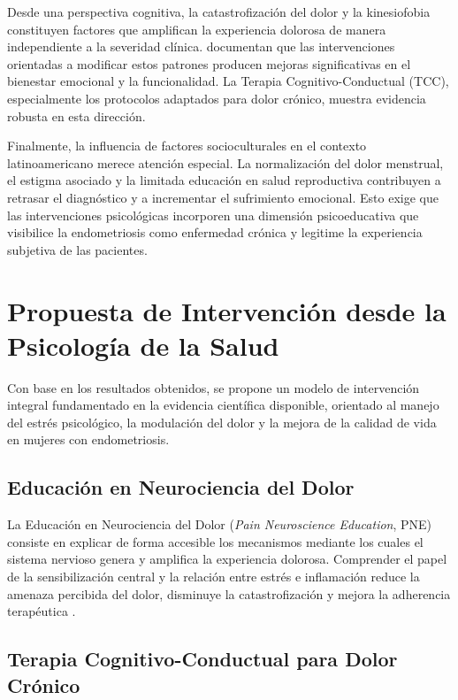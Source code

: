 \documentclass[12pt, a4paper]{article}
\begin{document}
Desde una perspectiva cognitiva, la catastrofización del dolor y la kinesiofobia constituyen
factores que amplifican la experiencia dolorosa de manera independiente a la severidad clínica.
\textcite{Aerts2018} documentan que las intervenciones orientadas a modificar estos patrones
producen mejoras significativas en el bienestar emocional y la funcionalidad. La Terapia
Cognitivo-Conductual (TCC), especialmente los protocolos adaptados para dolor crónico, muestra
evidencia robusta en esta dirección.

Finalmente, la influencia de factores socioculturales en el contexto latinoamericano merece
atención especial. La normalización del dolor menstrual, el estigma asociado y la limitada
educación en salud reproductiva contribuyen a retrasar el diagnóstico y a incrementar el
sufrimiento emocional. Esto exige que las intervenciones psicológicas incorporen una dimensión
psicoeducativa que visibilice la endometriosis como enfermedad crónica y legitime la experiencia
subjetiva de las pacientes.

\section{Propuesta de Intervención desde la Psicología de la Salud}

Con base en los resultados obtenidos, se propone un modelo de intervención integral
fundamentado en la evidencia científica disponible, orientado al manejo del estrés psicológico,
la modulación del dolor y la mejora de la calidad de vida en mujeres con endometriosis.

\subsection{Educación en Neurociencia del Dolor}

La Educación en Neurociencia del Dolor (\textit{Pain Neuroscience Education}, PNE) consiste en
explicar de forma accesible los mecanismos mediante los cuales el sistema nervioso genera y
amplifica la experiencia dolorosa. Comprender el papel de la sensibilización central y la
relación entre estrés e inflamación reduce la amenaza percibida del dolor, disminuye la
catastrofización y mejora la adherencia terapéutica \parencite{Finnerup2023}.

\subsection{Terapia Cognitivo-Conductual para Dolor Crónico}
\end{document}
